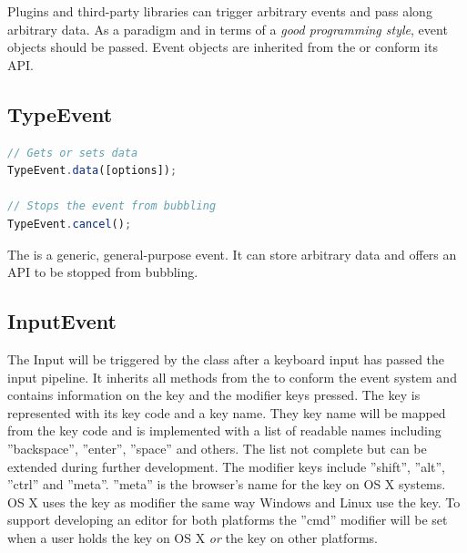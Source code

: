
Plugins and third-party libraries can trigger arbitrary events and pass along arbitrary data. As a paradigm and in terms of a \textit{good programming style}, event objects should be passed. Event objects are inherited from the  or conform its API.

\subsection{TypeEvent}
\label{subsec:type_event}

\begin{lstlisting}[language=JavaScript, caption={TypeEvent API}, label=lst:eventapi_methods]
// Gets or sets data
TypeEvent.data([options]);

// Stops the event from bubbling
TypeEvent.cancel();
\end{lstlisting}

The  is a generic, general-purpose event. It can store arbitrary data and offers an API to be stopped from bubbling. %

\subsection{InputEvent}
\label{subsec:input_event}

The Input  will be triggered by the  class after a keyboard input has passed the input pipeline. It inherits all methods from the  to conform the event system and contains information on the key and the modifier keys pressed. The key is represented with its key code and a key name. They key name will be mapped from the key code and is implemented with a list of readable names including ''backspace'', ''enter'', ''space'' and others. The list not complete but can be extended during further development. The modifier keys include ''shift'', ''alt'', ''ctrl'' and ''meta''. ''meta'' is the browser's name for the  key on OS X systems. OS X uses the  key as modifier the same way Windows and Linux use the  key. To support developing an editor for both platforms the ''cmd'' modifier will be set when a user holds the  key on OS X \textit{or} the  key on other platforms.

